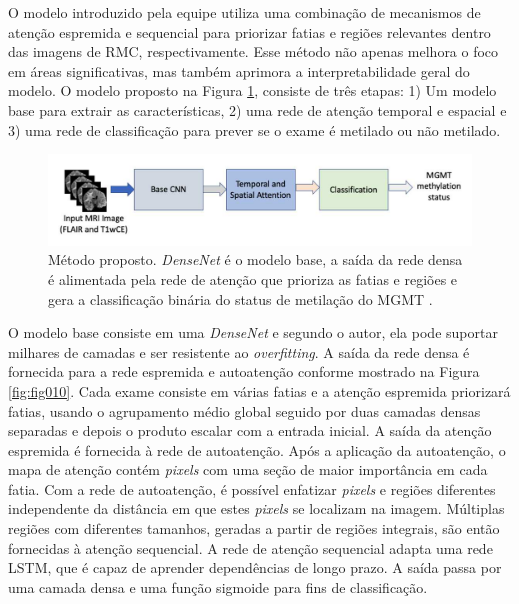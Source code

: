 O modelo introduzido pela equipe utiliza uma combinação de mecanismos de atenção espremida e sequencial para priorizar fatias e regiões relevantes dentro das imagens de \gls{RMC}, respectivamente. Esse método não apenas melhora o foco em áreas significativas, mas também aprimora a interpretabilidade geral do modelo. O modelo proposto na Figura \ref{fig:fig009}, consiste de três etapas: 1) Um modelo base para extrair as características, 2) uma rede de atenção temporal e espacial e 3) uma rede de classificação para prever se o exame é metilado ou não metilado. 

\begin{figure}[htbp]
    \centering
    \includegraphics[width=1\textwidth]{figures/fig009.png}
    \caption{Método proposto. \textit{DenseNet} é o modelo base, a saída da rede densa é alimentada pela rede de atenção que prioriza as fatias e regiões e gera a classificação binária do status de metilação do MGMT \cite{iranmehrImprovedPredictionMGMT2022}.
    }
    \label{fig:fig009}
\end{figure}

O modelo base consiste em uma \textit{DenseNet} e segundo o autor, ela pode suportar milhares de camadas e ser resistente ao \textit{overfitting}. A saída da rede densa é fornecida para a rede espremida e autoatenção conforme mostrado na Figura \ref{fig:fig010}. Cada exame consiste em várias fatias e a atenção espremida priorizará fatias, usando o agrupamento médio global seguido por duas camadas densas separadas e depois o produto escalar com a entrada inicial. A saída da atenção espremida é fornecida à rede de autoatenção. Após a aplicação da autoatenção, o mapa de atenção contém \textit{pixels} com uma seção de maior importância em cada fatia. Com a rede de autoatenção, é possível enfatizar \textit{pixels} e regiões diferentes independente da distância em que estes \textit{pixels} se localizam na imagem. Múltiplas regiões com diferentes tamanhos, geradas a partir de regiões integrais, são então fornecidas à atenção sequencial. A rede de atenção sequencial adapta uma rede \gls{LSTM}, que é capaz de aprender dependências de longo prazo. A saída passa por uma camada densa e uma função sigmoide para fins de classificação.

